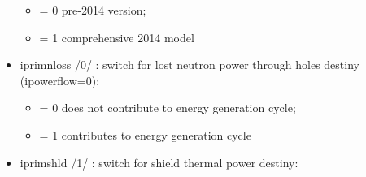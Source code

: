 \documentclass[]{article}
\providecommand{\tightlist}{%
  \setlength{\itemsep}{0pt}\setlength{\parskip}{0pt}}
\begin{document}
\begin{itemize}
  \begin{itemize}
  \tightlist
  \item
    = 0 pre-2014 version;
  \item
    = 1 comprehensive 2014 model
  \end{itemize}
\item
  iprimnloss /0/ : switch for lost neutron power through holes destiny
  (ipowerflow=0):

  \begin{itemize}
  \tightlist
  \item
    = 0 does not contribute to energy generation cycle;
  \item
    = 1 contributes to energy generation cycle
  \end{itemize}
\item
  iprimshld /1/ : switch for shield thermal power destiny:


\end{itemize}
\end{document}

